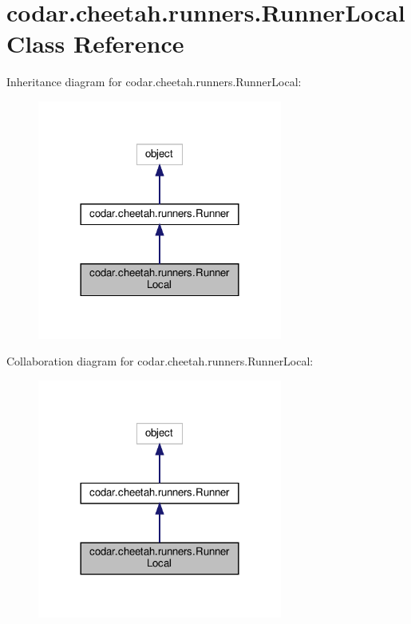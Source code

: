 \hypertarget{classcodar_1_1cheetah_1_1runners_1_1_runner_local}{}\section{codar.\+cheetah.\+runners.\+Runner\+Local Class Reference}
\label{classcodar_1_1cheetah_1_1runners_1_1_runner_local}


Inheritance diagram for codar.\+cheetah.\+runners.\+Runner\+Local\+:
\nopagebreak
\begin{figure}[H]
\begin{center}
\leavevmode
\includegraphics[width=228pt]{classcodar_1_1cheetah_1_1runners_1_1_runner_local__inherit__graph}
\end{center}
\end{figure}


Collaboration diagram for codar.\+cheetah.\+runners.\+Runner\+Local\+:
\nopagebreak
\begin{figure}[H]
\begin{center}
\leavevmode
\includegraphics[width=228pt]{classcodar_1_1cheetah_1_1runners_1_1_runner_local__coll__graph}
\end{center}
\end{figure}
